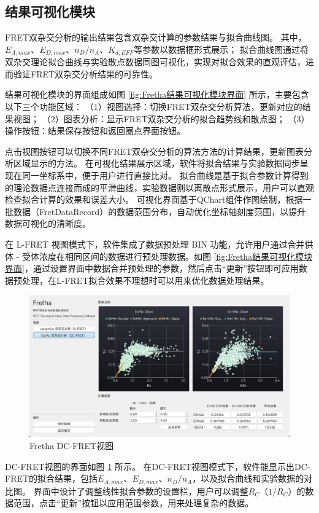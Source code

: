 \subsection{结果可视化模块}
\label{sec:结果可视化模块}
FRET双杂交分析的输出结果包含双杂交计算的参数结果与拟合曲线图。
其中，$E_{A,max}$、$E_{D,max}$、$n_D/n_A$、$K_{d,EFF}$等参数以数据框形式展示；
拟合曲线图通过将双杂交理论拟合曲线与实验散点数据同图可视化，实现对拟合效果的直观评估，进而验证FRET双杂交分析结果的可靠性。

结果可视化模块的界面组成如图 \ref{fig:Fretha结果可视化模块界面} 所示，主要包含以下三个功能区域：
（1）视图选择：切换FRET双杂交分析算法，更新对应的结果视图；
（2）图表分析：显示FRET双杂交分析的拟合趋势线和散点图；
（3）操作按钮：结果保存按钮和返回圈点界面按钮。

点击视图按钮可以切换不同FRET双杂交分析的算法方法的计算结果，更新图表分析区域显示的方法。
在可视化结果展示区域，软件将拟合结果与实验数据同步呈现在同一坐标系中，便于用户进行直接比对。
拟合曲线是基于拟合参数计算得到的理论数据点连接而成的平滑曲线，实验数据则以离散点形式展示，用户可以直观检查拟合计算的效果和误差大小。
可视化界面基于QChart组件作图绘制，根据一批数据（FretDataRecord）的数据范围分布，自动优化坐标轴刻度范围，以提升数据可视化的清晰度。

在 L-FRET 视图模式下，软件集成了数据预处理 BIN 功能，允许用户通过合并供体 - 受体浓度在相同区间的数据进行预处理数据。如图 \ref{fig:Fretha结果可视化模块界面}，通过设置界面中数据合并预处理的参数，然后点击“更新”按钮即可应用数据预处理，在L-FRET拟合效果不理想时可以用来优化数据处理结果。
\begin{figure}[htbp]
  \centering
  \includegraphics[width=0.9\linewidth]{../figures/2/DC-FRET结果界面.drawio.png}
  \caption{Fretha DC-FRET视图}
  \label{fig:fretha_dc_fret}
\end{figure}

DC-FRET视图的界面如图 \ref{fig:fretha_dc_fret} 所示。
在DC-FRET视图模式下，软件能显示出DC-FRET的拟合结果，包括$E_{A,max}$、$E_{D,max}$、$n_D/n_A$，以及拟合曲线和实验数据的对比图。
界面中设计了调整线性拟合参数的设置栏，用户可以调整$R_C$（$1/R_C$）的数据范围，点击“更新”按钮以应用范围参数，用来处理复杂的数据。

